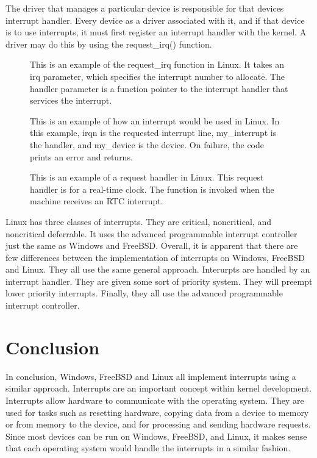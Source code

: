 \documentclass[journal,letterpaper,draftclsnofoot,onecolumn,10pt]{IEEEtran}
\begin{document}
The driver that manages a particular device is responsible for that devices interrupt handler. Every device as a driver associated with it, and if that device is to use interrupts, it must first register an interrupt handler with the kernel. A driver may do this by using the request\_irq() function.\cite{l05}

\begin{figure}[H]
   
   \caption{This is an example of the request\_irq function in Linux. It takes an irq parameter, which specifies the interrupt number to allocate. The handler parameter is a function pointer to the interrupt handler that services the interrupt.}
\end{figure}

\begin{figure}[H]
   
   \caption{This is an example of how an interrupt would be used in Linux. In this example, irqn is the requested interrupt line, my\_interrupt is the handler, and my\_device is the device. On failure, the code prints an error and returns.}
\end{figure}

\begin{figure}[H]
   
   \caption{This is an example of a request handler in Linux. This request handler is for a real-time clock. The function is invoked when the machine receives an RTC interrupt.}
\end{figure}

Linux has three classes of interrupts. They are critical, noncritical, and noncritical deferrable. It uses the advanced programmable interrupt controller just the same as Windows and FreeBSD. Overall, it is apparent that there are few differences between the implementation of interrupts on Windows, FreeBSD and Linux. They all use the same general approach. Interurpts are handled by an interrupt handler. They are given some sort of priority system. They will preempt lower priority interrupts. Finally, they all use the advanced programmable interrupt controller.

\section{Conclusion}
In conclusion, Windows, FreeBSD and Linux all implement interrupts using a similar approach. Interrupts are an important concept within kernel development. Interrupts allow hardware to communicate with the operating system. They are used for tasks such as resetting hardware, copying data from a device to memory or from memory to the device, and for processing and sending hardware requests. Since most devices can be run on Windows, FreeBSD, and Linux, it makes sense that each operating system would handle the interrupts in a similar fashion.

\vfill

\pagebreak




\end{document}
